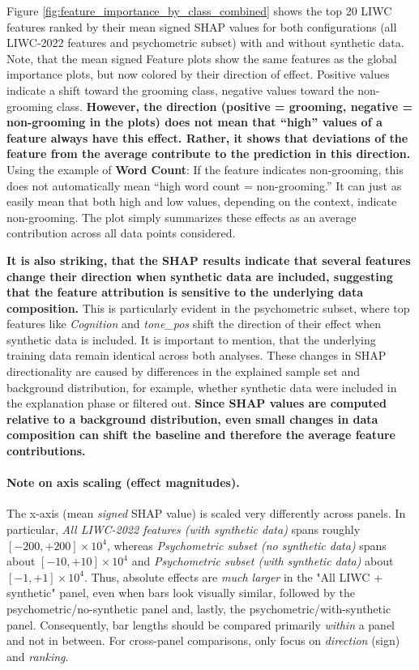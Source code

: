 Figure \ref{fig:feature_importance_by_class_combined} shows the top 20 LIWC features ranked by their mean signed SHAP values for both configurations (all LIWC-2022 features and psychometric subset) with and without synthetic data. Note, that the mean signed Feature plots show the same features as the global importance plots, but now colored by their direction of effect. Positive values indicate a shift toward the grooming class, negative values toward the non-grooming class. \textbf{However, the direction (positive = grooming, negative = non-grooming in the plots) does not mean that “high” values of a feature always have this effect. Rather, it shows that deviations of the feature from the average contribute to the prediction in this direction.}
Using the example of \textbf{Word Count}: If the feature indicates non-grooming, this does not automatically mean “high word count = non-grooming.” It can just as easily mean that both high and low values, depending on the context, indicate non-grooming. The plot simply summarizes these effects as an average contribution across all data points considered.

\textbf{ It is also striking, that the SHAP results indicate that several features change their direction when synthetic data are included, suggesting that the feature attribution is sensitive to the underlying data composition.} This is particularly evident in the psychometric subset, where top features like \textit{Cognition} and \textit{tone_pos} shift the direction of their effect when synthetic data is included. It is important to mention, that the underlying training data remain identical across both analyses. These changes in SHAP directionality are caused by differences in the explained sample set and background distribution, for example, whether synthetic data were included in the explanation phase or filtered out. \textbf{Since SHAP values are computed relative to a background distribution, even small changes in data composition can shift the baseline and therefore the average feature contributions.} 

\paragraph{Note on axis scaling (effect magnitudes).}
The x-axis (mean \emph{signed} SHAP value) is scaled very differently across panels. In particular, \emph{All LIWC-2022 features (with synthetic data)} spans roughly $[-200,+200]\times 10^{4}$, whereas \emph{Psychometric subset (no synthetic data)} spans about $[-10,+10]\times 10^{4}$ and \emph{Psychometric subset (with synthetic data)} about $[-1,+1]\times 10^{4}$. 
Thus, absolute effects are \emph{much larger} in the "All LIWC + synthetic" panel, even when bars look visually similar, followed by the psychometric/no-synthetic panel and, lastly, the psychometric/with-synthetic panel. 
Consequently, bar lengths should be compared primarily \emph{within} a panel and not in between. For cross-panel comparisons, only focus on \emph{direction} (sign) and \emph{ranking}.

